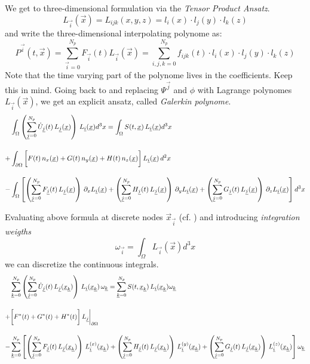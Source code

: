 We get to three-dimensional formulation via the \emph{Tensor Product Ansatz}.
\newcommand{\LI}{L_{\vec{i}}(\vec{x})}
\begin{equation}
\label{eq-tensor-ansatz}
    \LI = L_{ijk}(x,y,z) = l_i(x) \cdot l_j(y) \cdot l_k(z)
\end{equation}
and write the three-dimensional interpolating polynome as:
\newcommand{\PI}{P^{\vec{i}}(t,\vec{x})}
\newcommand{\FI}{F_{\vec{i}}(t)}
\newcommand{\sumI}{\sum^{N_p}_{\vec{i}=0}}
\begin{equation}
\label{eq-tensor-ansatz-interpolant}
    \PI = \sumI \FI \LI = \sum^{N_p}_{i,j,k = 0} f_{ijk}(t) \cdot l_i(x) \cdot l_j(y) \cdot l_k(z)
\end{equation}
Note that the time varying part of the polynome lives in the coefficients.
Keep this in mind.
\newcommand{\FJ}{F_{\vec{j}}(t)}
\newcommand{\GJ}{G_{\vec{j}}(t)}
\newcommand{\HJ}{H_{\vec{j}}(t)}
\newcommand{\STX}{S(t,\vec{x})}
\newcommand{\UJ}{ \dot{U}_{\vec{j}}(t)}
\newcommand{\LJ}{L_{\vec{j}}(\vec{x})}
\newcommand{\sumJ}{\sum^{N_p}_{\vec{j}=0}}
\newcommand{\nx}{n_x(\vec{x})}
\newcommand{\ny}{n_y(\vec{x})}
\newcommand{\nz}{n_z(\vec{x})}
Going back to  and replacing $\Psi^{\vec{j}}$
and $\phi$ with Lagrange polynomes $\LI$, we get an explicit ansatz, called
\emph{Galerkin polynome}.
\begin{align}
     &\int_\Omega \left(\sumJ \UJ \, \LJ \right) \, \LI d^3x = \int_\Omega \STX \, \LI d^3x \nonumber \br
    +&\int_{\partial\Omega} \bigg[ F(t) \, \nx + G(t) \, \ny + H(t)\, \nz \bigg]\,\LI\, d^2x \br
    -&\int_\Omega \left[
          \left(\sumJ \FJ \, \LJ \right) \, \partial_x \LI 
        + \left(\sumJ \HJ \, \LJ \right) \, \partial_y \LI
        + \left(\sumJ \GJ \, \LJ \right) \, \partial_z \LI \right] d^3x \nonumber
\end{align}

\newcommand{\sumK}{\sum^{N_p}_{\vec{k}=0}}
\newcommand{\wK}{\omega_{\vec{k}}}

\newcommand{\STXK}{S(t,\vec{x}_{\vec{k}})}
\newcommand{\LIK}{L_{\vec{i}}(\vec{x}_{\vec{k}})}
\newcommand{\LJK}{L_{\vec{j}}(\vec{x}_{\vec{k}})}

\newcommand{\LXIK}{L^{(x)}_{\vec{i}}(\vec{x}_{\vec{k}})}
\newcommand{\LYIK}{L^{(y)}_{\vec{i}}(\vec{x}_{\vec{k}})}
\newcommand{\LZIK}{L^{(z)}_{\vec{i}}(\vec{x}_{\vec{k}})}

Evaluating above formula at discrete nodes $\vec{x}_{\vec{i}}$ (cf.
) and introducing \emph{integration weigths}
\begin{equation}
\label{eqn:mass-matrix}
    \omega_{\vec{i}} = \int_{\Omega} \LI d^3 x
\end{equation}
we can discretize the continuous integrals.
\begin{align}
     &\sumK \left(\sumJ \UJ \, \LJK \right) \, \LIK \,\wK = \sumK \STXK \, \LIK \wK \nonumber \br
    +&\bigg[ F^*(t) + G^*(t) + H^*(t)\bigg] \, L_{\vec{j}}\bigg|_{\partial\Omega} \br
    -&\sumK \left[
          \left(\sumJ \FJ \, \LJK \right) \, \LXIK 
        + \left(\sumJ \HJ \, \LJK \right) \, \LYIK
        + \left(\sumJ \GJ \, \LJK \right) \, \LZIK \right] \wK \nonumber
\end{align}

